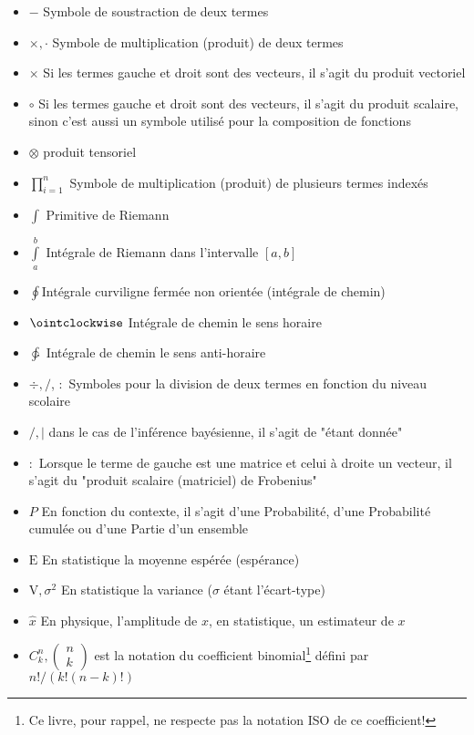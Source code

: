 \begin{itemize}[label={},leftmargin=0.5cm]
	 	\item $-$ Symbole de soustraction de deux termes
	 	\item $\times, \cdot$ Symbole de multiplication (produit) de deux termes
	 	\item $\times$ Si les termes gauche et droit sont des vecteurs, il s'agit du produit vectoriel
	 	\item $\circ$ Si les termes gauche et droit sont des vecteurs, il s'agit du produit scalaire, sinon c'est aussi un symbole utilisé pour la composition de fonctions
	 	\item $\otimes$ produit tensoriel
	 	\item $\displaystyle \prod_{i=1}^n$ Symbole de multiplication (produit) de plusieurs termes indexés
	 	\item $\displaystyle\int$ Primitive de Riemann
	 	\item $\displaystyle\int\limits_a^b$ Intégrale de Riemann dans l'intervalle $[a,b]$
	 	\item $\displaystyle\oint$Intégrale curviligne fermée non orientée (intégrale de chemin)
	 	\item $\displaystyle\ointclockwise$ Intégrale de chemin le sens horaire
	 	\item $\displaystyle\ointctrclockwise$ Intégrale de chemin le sens anti-horaire
	 	\item $\div, /$, $:$ Symboles pour la division de deux termes en fonction du niveau scolaire
	 	\item $/, |$ dans le cas de l'inférence bayésienne, il s'agit de "étant donnée"
	 	\item $:$ Lorsque le terme de gauche est une matrice et celui à droite un vecteur, il s'agit du "produit scalaire (matriciel) de Frobenius"
	 	\item $P$ En fonction du contexte, il s'agit d'une Probabilité, d'une Probabilité cumulée ou d'une Partie d'un ensemble
	 	\item $\text{E}$ En statistique la moyenne espérée (espérance)
	 	\item $\text{V},\sigma^2$ En statistique la variance ($\sigma$ étant l'écart-type)
	 	\item $\hat{x}$ En physique, l'amplitude de $x$, en statistique, un estimateur de $x$
	 	\item $C_k^n,\begin{pmatrix}n\\k\end{pmatrix}$ est la notation du coefficient binomial\footnote{Ce livre, pour rappel, ne respecte pas la notation ISO de ce coefficient!} défini par$n!/(k!(n-k)!)$

\end{itemize}

